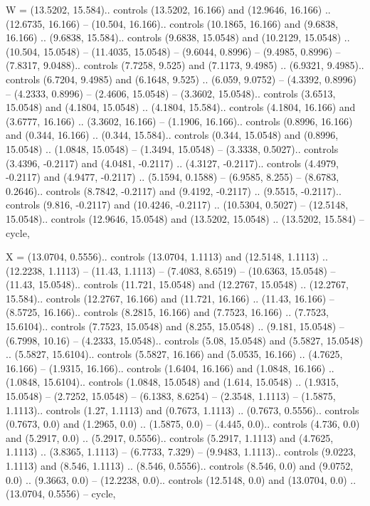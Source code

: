 W = {(13.5202, 15.584).. controls (13.5202, 16.166) and (12.9646, 16.166) .. (12.6735, 16.166) -- (10.504, 16.166).. controls (10.1865, 16.166) and (9.6838, 16.166) .. (9.6838, 15.584).. controls (9.6838, 15.0548) and (10.2129, 15.0548) .. (10.504, 15.0548) -- (11.4035, 15.0548) -- (9.6044, 0.8996) -- (9.4985, 0.8996) -- (7.8317, 9.0488).. controls (7.7258, 9.525) and (7.1173, 9.4985) .. (6.9321, 9.4985).. controls (6.7204, 9.4985) and (6.1648, 9.525) .. (6.059, 9.0752) -- (4.3392, 0.8996) -- (4.2333, 0.8996) -- (2.4606, 15.0548) -- (3.3602, 15.0548).. controls (3.6513, 15.0548) and (4.1804, 15.0548) .. (4.1804, 15.584).. controls (4.1804, 16.166) and (3.6777, 16.166) .. (3.3602, 16.166) -- (1.1906, 16.166).. controls (0.8996, 16.166) and (0.344, 16.166) .. (0.344, 15.584).. controls (0.344, 15.0548) and (0.8996, 15.0548) .. (1.0848, 15.0548) -- (1.3494, 15.0548) -- (3.3338, 0.5027).. controls (3.4396, -0.2117) and (4.0481, -0.2117) .. (4.3127, -0.2117).. controls (4.4979, -0.2117) and (4.9477, -0.2117) .. (5.1594, 0.1588) -- (6.9585, 8.255) -- (8.6783, 0.2646).. controls (8.7842, -0.2117) and (9.4192, -0.2117) .. (9.5515, -0.2117).. controls (9.816, -0.2117) and (10.4246, -0.2117) .. (10.5304, 0.5027) -- (12.5148, 15.0548).. controls (12.9646, 15.0548) and (13.5202, 15.0548) .. (13.5202, 15.584) -- cycle},

X = {(13.0704, 0.5556).. controls (13.0704, 1.1113) and (12.5148, 1.1113) .. (12.2238, 1.1113) -- (11.43, 1.1113) -- (7.4083, 8.6519) -- (10.6363, 15.0548) -- (11.43, 15.0548).. controls (11.721, 15.0548) and (12.2767, 15.0548) .. (12.2767, 15.584).. controls (12.2767, 16.166) and (11.721, 16.166) .. (11.43, 16.166) -- (8.5725, 16.166).. controls (8.2815, 16.166) and (7.7523, 16.166) .. (7.7523, 15.6104).. controls (7.7523, 15.0548) and (8.255, 15.0548) .. (9.181, 15.0548) -- (6.7998, 10.16) -- (4.2333, 15.0548).. controls (5.08, 15.0548) and (5.5827, 15.0548) .. (5.5827, 15.6104).. controls (5.5827, 16.166) and (5.0535, 16.166) .. (4.7625, 16.166) -- (1.9315, 16.166).. controls (1.6404, 16.166) and (1.0848, 16.166) .. (1.0848, 15.6104).. controls (1.0848, 15.0548) and (1.614, 15.0548) .. (1.9315, 15.0548) -- (2.7252, 15.0548) -- (6.1383, 8.6254) -- (2.3548, 1.1113) -- (1.5875, 1.1113).. controls (1.27, 1.1113) and (0.7673, 1.1113) .. (0.7673, 0.5556).. controls (0.7673, 0.0) and (1.2965, 0.0) .. (1.5875, 0.0) -- (4.445, 0.0).. controls (4.736, 0.0) and (5.2917, 0.0) .. (5.2917, 0.5556).. controls (5.2917, 1.1113) and (4.7625, 1.1113) .. (3.8365, 1.1113) -- (6.7733, 7.329) -- (9.9483, 1.1113).. controls (9.0223, 1.1113) and (8.546, 1.1113) .. (8.546, 0.5556).. controls (8.546, 0.0) and (9.0752, 0.0) .. (9.3663, 0.0) -- (12.2238, 0.0).. controls (12.5148, 0.0) and (13.0704, 0.0) .. (13.0704, 0.5556) -- cycle},

